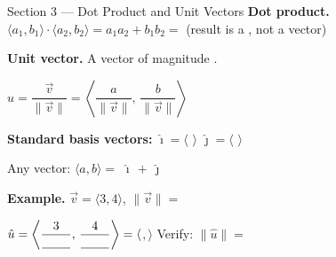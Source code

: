 \documentclass[10pt]{article}
\begin{document}
\vspace{0.08in}

\begin{notesbox}{Section 3 --- Dot Product and Unit Vectors}
\small
\textbf{Dot product.}
$\langle a_1,b_1\rangle \cdot \langle a_2,b_2\rangle
= a_1 a_2 + b_1 b_2 = $ \blank{4cm}
\quad (result is a \blank{2.5cm}, not a vector)

\vspace{0.12in}
\textbf{Unit vector.} A vector of magnitude \blank{0.8cm}.

\vspace{0.06in}
$\hat{u} = \dfrac{\vec{v}}{\|\vec{v}\|}
= \left\langle \dfrac{a}{\|\vec{v}\|},\, \dfrac{b}{\|\vec{v}\|} \right\rangle$

\vspace{0.1in}
\textbf{Standard basis vectors:}
$\hat{\imath} = \langle$ \blank{2cm}$\rangle$ \quad
$\hat{\jmath} = \langle$ \blank{2cm}$\rangle$

Any vector: $\langle a,b\rangle =$ \blank{1.5cm}$\hat{\imath}\, +\, $\blank{1.5cm}$\hat{\jmath}$

\vspace{0.12in}
\textbf{Example.} $\vec{v}=\langle 3,4\rangle$, $\|\vec{v}\| = $ \blank{1.5cm}

\vspace{0.06in}
$\hat{u} = \left\langle \dfrac{3}{\blank{0.8cm}},\, \dfrac{4}{\blank{0.8cm}} \right\rangle
= \langle$\blank{2cm}$,$\blank{2cm}$\rangle$ \quad
Verify: $\|\hat{u}\| = $ \blank{2.5cm}
\end{notesbox}

\vspace{0.08in}
\end{document}
